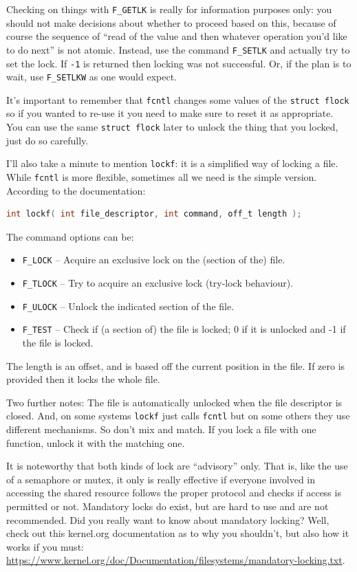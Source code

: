 Checking on things with \texttt{F\_GETLK} is really for information purposes only: you should not make decisions about whether to proceed based on this, because of course the sequence of ``read of the value and then whatever operation you'd like to do next'' is not atomic. Instead, use the command \texttt{F\_SETLK} and actually try to set the lock. If \texttt{-1} is returned then locking was not successful. Or, if the plan is to wait, use \texttt{F\_SETLKW} as one would expect.

It's important to remember that \texttt{fcntl} changes some values of the \texttt{struct flock} so if you wanted to re-use it you need to make sure to reset it as appropriate. You can use the same \texttt{struct flock} later to unlock the thing that you locked, just do so carefully.

I'll also take a minute to mention \texttt{lockf}: it is a simplified way of locking a file. While \texttt{fcntl} is more flexible, sometimes all we need is the simple version. According to the documentation:

\begin{lstlisting}[language=C]
int lockf( int file_descriptor, int command, off_t length );
\end{lstlisting}

The command options can be:
\begin{itemize}
	\item \texttt{F\_LOCK} -- Acquire an exclusive lock on the (section of the) file.
	\item \texttt{F\_TLOCK} -- Try to acquire an exclusive lock (try-lock behaviour).
	\item \texttt{F\_ULOCK} -- Unlock the indicated section of the file.
	\item \texttt{F\_TEST} -- Check if (a section of) the file is locked; 0 if it is unlocked and -1 if the file is locked.
\end{itemize}


The length is an offset, and is based off the current position in the file. If zero is provided then it locks the whole file.

Two further notes: The file is automatically unlocked when the file descriptor is closed. And, on some systems \texttt{lockf} just calls \texttt{fcntl} but on some others they use different mechanisms. So don't mix and match. If you lock a file with one function, unlock it with the matching one.

It is noteworthy that both kinds of lock are ``advisory'' only. That is, like the use of a semaphore or mutex, it only is really effective if everyone involved in accessing the shared resource follows the proper protocol and checks if access is permitted or not. Mandatory locks do exist, but are hard to use and are not recommended. Did you really want to know about mandatory locking? Well, check out this kernel.org documentation as to why you shouldn't, but also how it works if you must: \url{https://www.kernel.org/doc/Documentation/filesystems/mandatory-locking.txt}.

